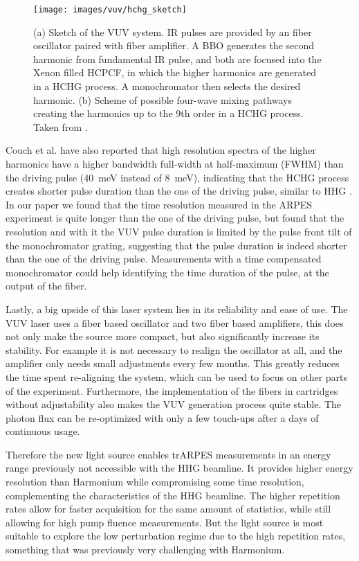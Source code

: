 \begin{figure}
	\centering
	\texttt{[image: images/vuv/hchg\_sketch]}
	\caption{(a) Sketch of the VUV system. IR pulses are provided by an  fiber oscillator paired with fiber amplifier. A BBO generates the second harmonic from fundamental IR pulse, and both are focused into the Xenon filled HCPCF, in which the higher harmonics are generated in a HCHG process. A monochromator then selects the desired harmonic. (b) Scheme of possible four-wave mixing pathways creating the harmonics up to the 9th order in a HCHG process. Taken from \cite{couch_ultrafast_2020}.}
	\label{fig:hchgsketch}
\end{figure}


Couch et al. \cite{couch_ultrafast_2020} have also reported that high resolution spectra of the higher harmonics have a higher bandwidth full-width at half-maximum (FWHM) than the driving pulse (\qty{40}{\milli\electronvolt} instead of \qty{8}{\milli\electronvolt}), indicating that the HCHG process creates shorter pulse duration than the one of the driving pulse, similar to HHG \cite{gagnon_soft_2007}.
In our paper \cite{hellbruck_high-resolution_2024} we found that the time resolution measured in the ARPES experiment is quite longer than the one of the driving pulse, but found that the resolution and with it the VUV pulse duration is limited by the pulse front tilt of the monochromator grating, suggesting that the pulse duration is indeed shorter than the one of the driving pulse.
Measurements with a time compensated monochromator could help identifying the time duration of the pulse, at the output of the fiber.

Lastly, a big upside of this laser system lies in its reliability and ease of use.
The VUV laser uses a fiber based oscillator and two fiber based amplifiers, this does not only make the source more compact, but also significantly increase its stability.
For example it is not necessary to realign the oscillator at all, and the amplifier only needs small adjustments every few months.
This greatly reduces the time spent re-aligning the system, which can be used to focus on other parts of the experiment.
Furthermore, the implementation of the fibers in cartridges without adjustability also makes the VUV generation process quite stable.
The photon flux can be re-optimized with only a few touch-ups after a days of continuous usage.

Therefore the new light source enables trARPES measurements in an energy range previously not accessible with the HHG beamline.
It provides higher energy resolution than Harmonium while compromising some time resolution, complementing the characteristics of the HHG beamline.
The higher repetition rates allow for faster acquisition for the same amount of statistics, while still allowing for high pump fluence measurements.
But the light source is most suitable to explore the low perturbation regime due to the high repetition rates, something that was previously very challenging with Harmonium.

